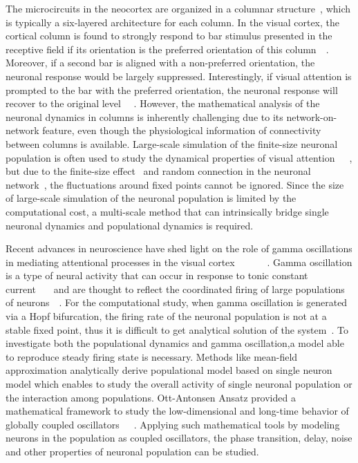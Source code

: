 \documentclass[10pt,letterpaper]{article}
\begin{document}
The microcircuits in the neocortex are organized in a columnar structure~\cite{Mountcastle1957}, which is typically a six-layered architecture for each column. In the visual cortex, the cortical column is found to strongly respond to bar stimulus presented in the receptive field if its orientation is the preferred orientation of this column~\cite{hubel1959}~\cite{reynolds1999}. Moreover, if a second bar is aligned with a non-preferred orientation, the neuronal response would be largely suppressed. Interestingly, if visual attention is prompted to the bar with the preferred orientation, the neuronal response will recover to the original level ~\cite{reynolds1999}~\cite{luck1997}. However, the mathematical analysis of the neuronal dynamics in columns is inherently challenging due to its network-on-network feature, even though the physiological information of connectivity between columns is available. Large-scale simulation of the finite-size neuronal population is often used to study the dynamical properties of visual attention~\cite{corchs2002}~\cite{wagatsuma2011}~\cite{potjans2012}, but due to the finite-size effect~\cite{pikovsky1999} and random connection in the neuronal network~\cite{landau2018}, the fluctuations around fixed points cannot be ignored. Since the size of large-scale simulation of the neuronal population is limited by the computational cost, a multi-scale method that can intrinsically bridge single neuronal dynamics and populational dynamics is required.

Recent advances in neuroscience have shed light on the role of gamma oscillations in mediating attentional processes in the visual cortex ~\cite{fries2009}~\cite{tiesinga2009}~\cite{ardid2010}~\cite{goddard2012}~\cite{bosman2012}~\cite{magazzini2018}. Gamma oscillation is a type of neural activity that can occur in response to tonic constant current~\cite{whittington1995}~\cite{bartos2007}~\cite{akao2018} and are thought to reflect the coordinated firing of large populations of neurons~\cite{wang2012}~\cite{kumar2012}. For the computational study, when gamma oscillation is generated via a Hopf bifurcation, the firing rate of the neuronal population is not at a stable fixed point, thus it is difficult to get analytical solution of the system~\cite{kotani2014}. To investigate both the populational dynamics and gamma oscillation,a model able to reproduce steady firing state is necessary. Methods like mean-field approximation analytically derive populational model based on single neuron model which enables to study the overall activity of single neuronal population or the interaction among populations. Ott-Antonsen Ansatz provided a mathematical framework to study the low-dimensional and long-time behavior of globally coupled oscillators~\cite{ott2008}~\cite{ott2009}~\cite{montbrio2015}. Applying such mathematical tools by modeling neurons in the population as coupled oscillators, the phase transition, delay, noise and other properties of neuronal population can be studied. 
\end{document}
